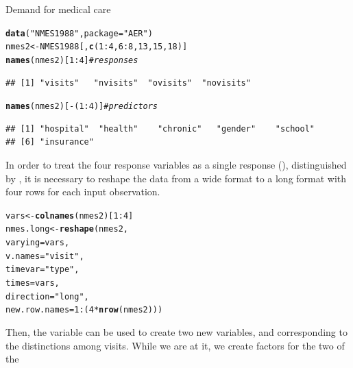 \documentclass[11pt]{book}\usepackage[]{graphicx}\usepackage[]{color}
\makeatletter
\newcommand{\hlnum}[1]{\textcolor[rgb]{0.686,0.059,0.569}{#1}}%
\newcommand{\hlstr}[1]{\textcolor[rgb]{0.192,0.494,0.8}{#1}}%
\newcommand{\hlcom}[1]{\textcolor[rgb]{0.678,0.584,0.686}{\textit{#1}}}%
\newcommand{\hlopt}[1]{\textcolor[rgb]{0,0,0}{#1}}%
\newcommand{\hlstd}[1]{\textcolor[rgb]{0.345,0.345,0.345}{#1}}%
\newcommand{\hlkwb}[1]{\textcolor[rgb]{0.69,0.353,0.396}{#1}}%
\newcommand{\hlkwc}[1]{\textcolor[rgb]{0.333,0.667,0.333}{#1}}%
\newcommand{\hlkwd}[1]{\textcolor[rgb]{0.737,0.353,0.396}{\textbf{#1}}}%
\newenvironment{kframe}{%
 \def\at@end@of@kframe{}%
 \ifinner\ifhmode%
  \def\at@end@of@kframe{\end{minipage}}%
  \begin{minipage}{\columnwidth}%
 \fi\fi%
 \def\FrameCommand##1{\hskip\@totalleftmargin \hskip-\fboxsep
 \colorbox{shadecolor}{##1}\hskip-\fboxsep
     \hskip-\linewidth \hskip-\@totalleftmargin \hskip\columnwidth}%
 \MakeFramed {\advance\hsize-\width
   \@totalleftmargin\z@ \linewidth\hsize
   \@setminipage}}%
 {\par\unskip\endMakeFramed%
 \at@end@of@kframe}
\newenvironment{knitrout}{}{} %
\renewenvironment{knitrout}{\small\renewcommand{\baselinestretch}{.85}}{} %
\makeatother
\begin{document}
\begin{Example}[nmes4]{Demand for medical care}
\begin{knitrout}
\color{fgcolor}\begin{kframe}
\begin{alltt}
\hlkwd{data}\hlstd{(}\hlstr{"NMES1988"}\hlstd{,} \hlkwc{package}\hlstd{=}\hlstr{"AER"}\hlstd{)}
\hlstd{nmes2} \hlkwb{<-} \hlstd{NMES1988[,} \hlkwd{c}\hlstd{(}\hlnum{1}\hlopt{:}\hlnum{4}\hlstd{,} \hlnum{6}\hlopt{:}\hlnum{8}\hlstd{,} \hlnum{13}\hlstd{,} \hlnum{15}\hlstd{,} \hlnum{18}\hlstd{)]}
\hlkwd{names}\hlstd{(nmes2)[}\hlnum{1}\hlopt{:}\hlnum{4}\hlstd{]}     \hlcom{# responses}
\end{alltt}
\begin{verbatim}
## [1] "visits"   "nvisits"  "ovisits"  "novisits"
\end{verbatim}
\begin{alltt}
\hlkwd{names}\hlstd{(nmes2)[}\hlopt{-}\hlstd{(}\hlnum{1}\hlopt{:}\hlnum{4}\hlstd{)]}  \hlcom{# predictors}
\end{alltt}
\begin{verbatim}
## [1] "hospital"  "health"    "chronic"   "gender"    "school"   
## [6] "insurance"
\end{verbatim}
\end{kframe}
\end{knitrout}
In order to treat the four response variables as a single response (), distinguished
by , it is necessary to reshape the data from a wide format to a long format with
four rows for each input observation.
\begin{knitrout}
\color{fgcolor}\begin{kframe}
\begin{alltt}
\hlstd{vars} \hlkwb{<-} \hlkwd{colnames}\hlstd{(nmes2)[}\hlnum{1}\hlopt{:}\hlnum{4}\hlstd{]}
\hlstd{nmes.long} \hlkwb{<-} \hlkwd{reshape}\hlstd{(nmes2,}
  \hlkwc{varying} \hlstd{= vars,}
  \hlkwc{v.names} \hlstd{=} \hlstr{"visit"}\hlstd{,}
  \hlkwc{timevar} \hlstd{=} \hlstr{"type"}\hlstd{,}
  \hlkwc{times} \hlstd{= vars,}
  \hlkwc{direction} \hlstd{=} \hlstr{"long"}\hlstd{,}
  \hlkwc{new.row.names} \hlstd{=} \hlnum{1}\hlopt{:}\hlstd{(}\hlnum{4}\hlopt{*}\hlkwd{nrow}\hlstd{(nmes2)))}
\end{alltt}
\end{kframe}
\end{knitrout}
Then, the  variable can be used to create two new variables,  and 
corresponding to the distinctions among visits.  While we are at it, we create factors for the two of the

\end{Example}
\end{document}
